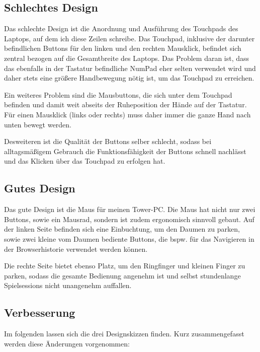 \documentclass[a4paper,10pt]{scrartcl}
\begin{document}
\kopf
\renewcommand{\figurename}{Figure}


\subsection*{Schlechtes Design}

Das schlechte Design ist die Anordnung und Ausführung des Touchpads des Laptops, auf dem ich diese Zeilen schreibe. Das Touchpad, inklusive der darunter befindlichen Buttons für den linken und den rechten Mausklick, befindet sich zentral bezogen auf die Gesamtbreite des Laptops. 
Das Problem daran ist, dass das ebenfalls in der Tastatur befindliche NumPad eher selten verwendet wird und daher stets eine größere Handbewegung nötig ist, um das Touchpad zu erreichen.

Ein weiteres Problem sind die Mausbuttons, die sich unter dem Touchpad befinden und damit weit abseits der Ruheposition der Hände auf der Tastatur. Für einen Mausklick (links oder rechts) muss daher immer die ganze Hand nach unten bewegt werden.

Desweiteren ist die Qualität der Buttons selber schlecht, sodass bei alltagsmäßigem Gebrauch die Funktionsfähigkeit der Buttons schnell nachlässt und das Klicken über das Touchpad zu erfolgen hat.

\subsection*{Gutes Design}

Das gute Design ist die Maus für meinen Tower-PC. Die Maus hat nicht nur zwei Buttons, sowie ein Mausrad, sondern ist zudem ergonomisch sinnvoll gebaut.
Auf der linken Seite befinden sich eine Einbuchtung, um den Daumen zu parken, sowie zwei kleine vom Daumen bediente Buttons, die bspw. für das Navigieren in der Browserhistorie verwendet werden können.

Die rechte Seite bietet ebenso Platz, um den Ringfinger und kleinen Finger zu parken, sodass die gesamte Bedienung angenehm ist und selbst stundenlange Spielsessions nicht unangenehm auffallen.

\subsection*{Verbesserung}

Im folgenden lassen sich die drei Designskizzen finden. Kurz zusammengefasst werden diese Änderungen vorgenommen:
\end{document}
